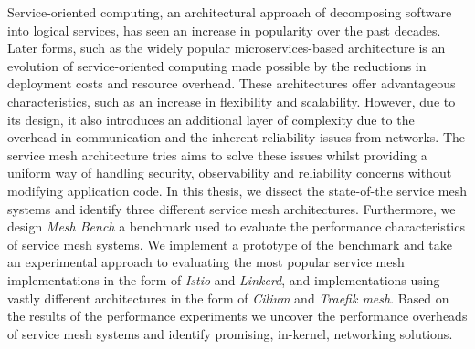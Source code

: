 


\begin{abstracts}        %
Service-oriented computing, an architectural approach of decomposing software into logical services, has seen an increase in popularity over the past decades. Later forms, such as the widely popular microservices-based architecture is an evolution of service-oriented computing made possible by the reductions in deployment costs and resource overhead. These architectures offer advantageous characteristics, such as an increase in flexibility and scalability. However, due to its design, it also introduces an additional layer of complexity due to the overhead in communication and the inherent reliability issues from networks. The service mesh architecture tries aims to solve these issues whilst providing a uniform way of handling security, observability and reliability concerns without modifying application code. In this thesis, we dissect the state-of-the service mesh systems and identify three different service mesh architectures. Furthermore, we design \textit{Mesh Bench} a benchmark used to evaluate the performance characteristics of service mesh systems. We implement a prototype of the benchmark and take an experimental approach to evaluating the most popular service mesh implementations in the form of \textit{Istio} and \textit{Linkerd}, and implementations using vastly different architectures in the form of \textit{Cilium} and \textit{Traefik mesh}. Based on the results of the performance experiments we uncover the performance overheads of service mesh systems and identify promising, in-kernel, networking solutions.

\end{abstracts}



